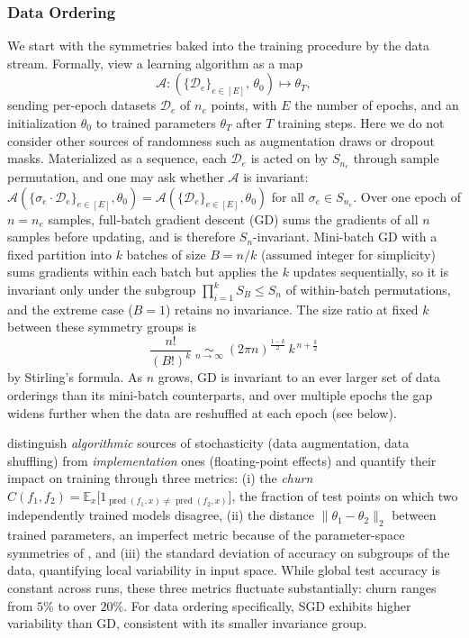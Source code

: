 \documentclass[mathematics,review,submit,moreauthors]{Definitions/mdpi}
\begin{document}
\subsubsection{Data Ordering}\label{sec:data-ordering}
We start with the symmetries baked into the training procedure by the data stream.
Formally, view a learning algorithm as a map
$$
\mathcal{A} : \left ( \{\mathcal{D}_e\}_{e\in [E]},\, \theta_0 \right ) \longmapsto \theta_T,
$$
sending per-epoch datasets $\mathcal{D}_e$ of $n_e$ points, with $E$ the number of epochs, and an initialization $\theta_0$ to trained parameters $\theta_T$ after $T$ training steps.
Here we do not consider other sources of randomness such as augmentation draws or dropout masks.
Materialized as a sequence, each $\mathcal{D}_e$ is acted on by $S_{n_e}$ through sample permutation, and one may ask whether $\mathcal{A}$ is invariant: $\mathcal{A}(\{\sigma_e\cdot\mathcal{D}_e\}_{e\in [E]},\theta_0)=\mathcal{A}(\{\mathcal{D}_e\}_{e\in [E]},\theta_0)$ for all $\sigma_e\in S_{n_e}$.
Over one epoch of $n=n_e$ samples, full-batch gradient descent (GD) sums the gradients of all $n$ samples before updating, and is therefore $S_n$-invariant.
Mini-batch GD with a fixed partition into $k$ batches of size $B=n/k$ (assumed integer for simplicity) sums gradients within each batch but applies the $k$ updates sequentially, so it is invariant only under the subgroup $\prod_{i=1}^{k} S_B \leq S_n$ of within-batch permutations, and the extreme case ($B=1$) retains no invariance.
The size ratio at fixed $k$ between these symmetry groups is
$$
\frac{n!}{(B!)^{k}} \;\underset{n\to\infty}{\sim}\; (2\pi n)^{\frac{1-k}{2}}\, k^{\,n+\frac{k}{2}}
$$
by Stirling's formula.
As $n$ grows, GD is invariant to an ever larger set of data orderings than its mini-batch counterparts, and over multiple epochs the gap widens further when the data are reshuffled at each epoch (see below).

\citet{zhuang2022pmls} distinguish \emph{algorithmic} sources of stochasticity (data augmentation, data shuffling) from \emph{implementation} ones (floating-point effects) and quantify their impact on training through three metrics: (i) the \emph{churn} $C(f_1,f_2)=\mathbb{E}_x\big[1_{\operatorname{pred}(f_1,x)\neq \operatorname{pred}(f_2,x)}\big]$, the fraction of test points on which two independently trained models disagree, (ii) the distance $\|\theta_1-\theta_2\|_2$ between trained parameters, an imperfect metric because of the parameter-space symmetries of , and (iii) the standard deviation of accuracy on subgroups of the data, quantifying local variability in input space.
While global test accuracy is constant across runs, these three metrics fluctuate substantially: churn ranges from $5\%$ to over $20\%$.
For data ordering specifically, SGD exhibits higher variability than GD, consistent with its smaller invariance group.
\end{document}
